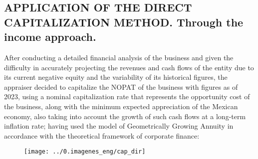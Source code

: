 \subsection{APPLICATION OF THE DIRECT CAPITALIZATION METHOD. Through the income approach.} 


After conducting a detailed financial analysis of the business and given the difficulty in accurately projecting the revenues and cash flows of the entity due to its current negative equity and the variability of its historical figures, the appraiser decided to capitalize the NOPAT of the business with figures as of 2023, using a nominal capitalization rate that represents the opportunity cost of the business, along with the minimum expected appreciation of the Mexican economy, also taking into account the growth of such cash flows at a long-term inflation rate; having used the model of Geometrically Growing Annuity in accordance with the theoretical framework of corporate finance:\\


\begin{figure}[H]
\centering
\texttt{[image: ../0.imagenes\_eng/cap\_dir]}
\end{figure}

